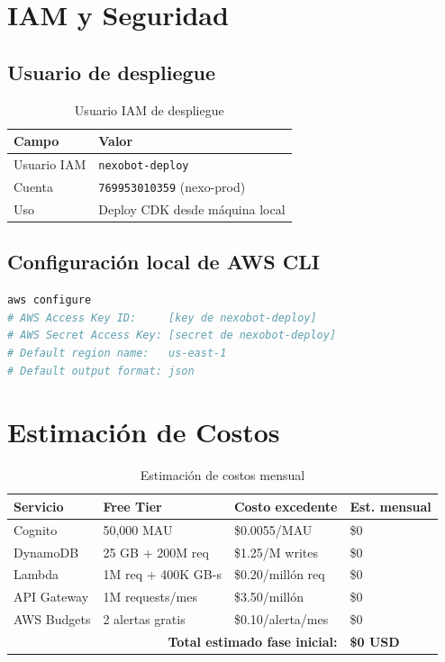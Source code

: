 \documentclass[12pt,a4paper]{article}
\begin{document}
\section{IAM y Seguridad}

\subsection{Usuario de despliegue}

\begin{table}[H]
\centering
\begin{tabular}{@{}ll@{}}
\toprule
\textbf{Campo} & \textbf{Valor} \\
\midrule
Usuario IAM & \texttt{nexobot-deploy} \\
Cuenta & \texttt{769953010359} (nexo-prod) \\
Uso & Deploy CDK desde máquina local \\
\bottomrule
\end{tabular}
\caption{Usuario IAM de despliegue}
\end{table}

\subsection{Configuración local de AWS CLI}

\begin{lstlisting}[language=bash, caption={Configurar credenciales}]
aws configure
# AWS Access Key ID:     [key de nexobot-deploy]
# AWS Secret Access Key: [secret de nexobot-deploy]
# Default region name:   us-east-1
# Default output format: json
\end{lstlisting}

\section{Estimación de Costos}

\begin{table}[H]
\centering
\begin{tabular}{@{}llll@{}}
\toprule
\textbf{Servicio} & \textbf{Free Tier} & \textbf{Costo excedente} & \textbf{Est. mensual} \\
\midrule
Cognito & 50,000 MAU & \$0.0055/MAU & \$0 \\
DynamoDB & 25 GB + 200M req & \$1.25/M writes & \$0 \\
Lambda & 1M req + 400K GB-s & \$0.20/millón req & \$0 \\
API Gateway & 1M requests/mes & \$3.50/millón & \$0 \\
AWS Budgets & 2 alertas gratis & \$0.10/alerta/mes & \$0 \\
\midrule
\multicolumn{3}{r}{\textbf{Total estimado fase inicial:}} & \textbf{\$0 USD} \\
\bottomrule
\end{tabular}
\caption{Estimación de costos mensual}
\end{table}
\end{document}

